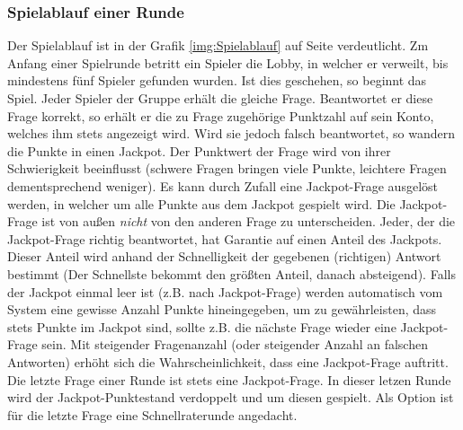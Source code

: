 \documentclass[11pt,a4paper]{scrreprt}
\begin{document}
\subsubsection{Spielablauf einer Runde}
Der Spielablauf ist in der Grafik \ref{img:Spielablauf} auf Seite \pageref{img:Spielablauf} verdeutlicht.
Zm Anfang einer Spielrunde betritt ein Spieler die Lobby, in welcher er verweilt, bis mindestens fünf Spieler gefunden wurden. Ist dies geschehen, so beginnt das Spiel. Jeder Spieler der Gruppe erhält die gleiche Frage. Beantwortet er diese Frage korrekt, so erhält er die zu Frage zugehörige Punktzahl auf sein Konto, welches ihm stets angezeigt wird. Wird sie jedoch falsch beantwortet, so wandern die Punkte in einen Jackpot. Der Punktwert der Frage wird von ihrer Schwierigkeit beeinflusst (schwere Fragen bringen viele Punkte, leichtere Fragen dementsprechend weniger). Es kann durch Zufall eine Jackpot-Frage ausgelöst werden, in welcher um alle Punkte aus dem Jackpot gespielt wird. Die Jackpot-Frage ist von außen \textit{nicht} von den anderen Frage zu unterscheiden. Jeder, der die Jackpot-Frage richtig beantwortet, hat Garantie auf einen Anteil des Jackpots. Dieser Anteil wird anhand der Schnelligkeit der gegebenen (richtigen) Antwort bestimmt (Der Schnellste bekommt den größten Anteil, danach absteigend). Falls der Jackpot einmal leer ist (z.B. nach Jackpot-Frage) werden automatisch vom System eine gewisse Anzahl Punkte hineingegeben, um zu gewährleisten, dass stets Punkte im Jackpot sind, sollte z.B. die nächste Frage wieder eine Jackpot-Frage sein. Mit steigender Fragenanzahl (oder steigender Anzahl an falschen Antworten) erhöht sich die Wahrscheinlichkeit, dass eine Jackpot-Frage auftritt. Die letzte Frage einer Runde ist stets eine Jackpot-Frage. In dieser letzen Runde wird der Jackpot-Punktestand verdoppelt und um diesen gespielt. Als Option ist für die letzte Frage eine Schnellraterunde angedacht.
\end{document}
